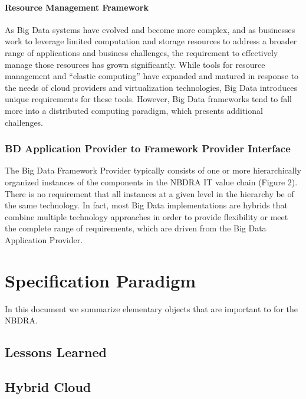 \documentclass[10pt]{article}
\begin{document}
\paragraph{Resource Management Framework}

As Big Data systems have evolved and become more complex, and as businesses work to leverage limited computation and storage resources to address a broader range of applications and business challenges, the requirement to effectively manage those resources has grown significantly. While tools for resource management and “elastic computing” have expanded and matured in response to the needs of cloud providers and virtualization technologies, Big Data introduces unique requirements for these tools. However, Big Data frameworks tend to fall more into a distributed computing paradigm, which presents additional challenges. 

\subsubsection{BD Application Provider to Framework Provider
  Interface}

The Big Data Framework Provider typically consists of one or more hierarchically organized instances of the components in the NBDRA IT value chain (Figure 2). There is no requirement that all instances at a given level in the hierarchy be of the same technology. In fact, most Big Data implementations are hybrids that combine multiple technology approaches in order to provide flexibility or meet the complete range of requirements, which are driven from the Big Data Application Provider. 


	
\section{Specification Paradigm}

In this document we summarize elementary objects that are important to
for the NBDRA.

\subsection{Lessons Learned}


\subsection{Hybrid Cloud}
\end{document}
